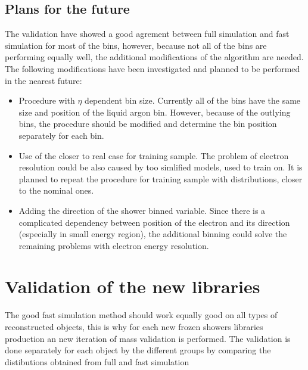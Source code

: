 \subsection{Plans for the future}\label{sec:FSImpr}

The validation have showed a good agrement between full simulation and fast simulation for most of the bins, however, because not all of the bins are performing equally well, the additional modifications of the algorithm are needed. The following modifications have been investigated and planned to be performed in the nearest future:
\begin{itemize}
\item Procedure with $\eta$ dependent bin size. Currently all of the bins have the same size and position of the liquid argon bin. However, because of the outlying bins, the procedure should be modified and determine the bin position separately for each bin.
\item Use of the closer to real case for training sample. The problem of electron resolution could be also caused by too simlified models, used to train on. It is planned to repeat the procedure for training sample with distributions, closer to the nominal ones.
\item Adding the direction of the shower binned variable. Since there is a complicated dependency between position of the electron and its direction (especially in small energy region), the additional binning could solve the remaining problems with electron energy resolution.
\end{itemize}

\section{Validation of the new libraries}\label{sec:FSValidation}

The good fast simulation method should work equally good on all types of reconstructed objects, this is why for each new frozen showers libraries production an new iteration of mass validation is performed. The validation is done separately for each object by the different groups by comparing the distibutions obtained from full and fast simulation

